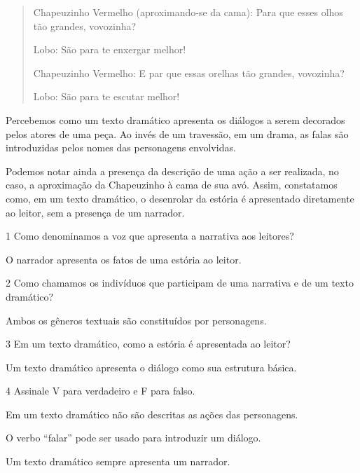 {\begin{quote}
Chapeuzinho Vermelho (aproximando-se da cama): Para que esses olhos
tão grandes, vovozinha?

Lobo: São para te enxergar melhor!

Chapeuzinho Vermelho: E par que essas orelhas tão grandes, vovozinha?

Lobo: São para te escutar melhor!
\end{quote}

Percebemos como um texto dramático apresenta os diálogos a serem
decorados pelos atores de uma peça. Ao invés de um travessão, em um
drama, as falas são introduzidas pelos nomes das personagens envolvidas.

Podemos notar ainda a presença da descrição de uma ação a ser realizada,
no caso, a aproximação da Chapeuzinho à cama de sua avó. Assim,
constatamos como, em um texto dramático, o desenrolar da estória é
apresentado diretamente ao leitor, sem a presença de um narrador.}


\num{1} Como denominamos a voz que apresenta a narrativa aos leitores?

O narrador apresenta os fatos de uma estória ao leitor.


\num{2} Como chamamos os indivíduos que participam de uma narrativa e de um
texto dramático?

Ambos os gêneros textuais são constituídos por personagens.


\num{3} Em um texto dramático, como a estória é apresentada ao leitor?

Um texto dramático apresenta o diálogo como sua estrutura básica.


\num{4} Assinale V para verdadeiro e F para falso.

\begin{boxlist}
\item Em um texto dramático não são descritas as ações das personagens. 

\item O verbo ``falar'' pode ser usado para introduzir um diálogo. 

\item Um texto dramático sempre apresenta um narrador. 
\end{boxlist}

